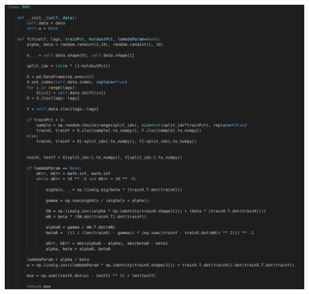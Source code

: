 \documentclass{article}
\begin{document}
\includegraphics[width=\textwidth]{../output/code1.png}
\end{document}
